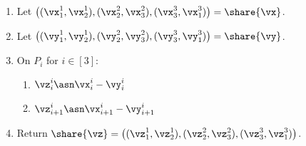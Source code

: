   \begin{enumerate}
  \item Let $\left( (\vx_1^1, \vx_2^1), (\vx_2^2, \vx_3^2), (\vx_3^3, \vx_1^3) \right) = \share{\vx}$.

  \item Let $\left( (\vy_1^1, \vy_2^1), (\vy_2^2, \vy_3^2), (\vy_3^3, \vy_1^3) \right) = \share{\vy}$.

  \item On $P_i$ for $i \in [3]$:
  \begin{enumerate}
    \item $\vz_i^i \asn \vx_i^i - \vy_i^i$
    \item $\vz_{i+1}^i \asn \vx_{i+1}^i - \vy_{i+1}^i$
  \end{enumerate}

  \item Return $\share{\vz} = \left( (\vz_1^1, \vz_2^1), (\vz_2^2, \vz_3^2), (\vz_3^3, \vz_1^3) \right)$.
  \end{enumerate}
